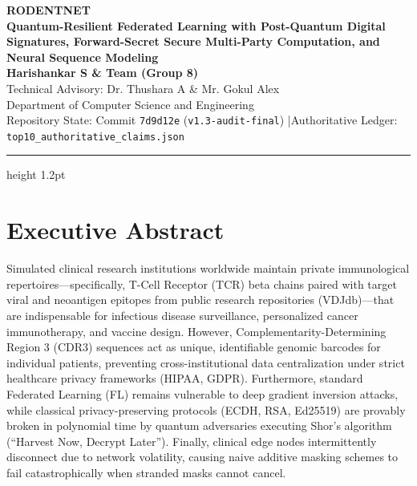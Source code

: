 \documentclass[11pt,a4paper]{report}
\begin{document}
\begin{center}
  {\Huge \textbf{RODENTNET}}\\[0.4cm]
  {\LARGE \textbf{Quantum-Resilient Federated Learning with Post-Quantum Digital Signatures, Forward-Secret Secure Multi-Party Computation, and Neural Sequence Modeling}}\\[0.6cm]
  {\large \textbf{Harishankar S \& Team (Group 8)}}\\[0.2cm]
  {\normalsize Technical Advisory: Dr. Thushara A \& Mr. Gokul Alex}\\[0.15cm]
  {\small Department of Computer Science and Engineering}\\[0.15cm]
  {\footnotesize Repository State: Commit \texttt{7d9d12e} (\texttt{v1.3-audit-final}) \quad|\quad Authoritative Ledger: \texttt{top10\_authoritative\_claims.json}}\\[0.4cm]
  \hrule height 1.2pt
\end{center}
\vspace{0.4cm}

\section*{Executive Abstract}
Simulated clinical research institutions worldwide maintain private immunological repertoires—specifically, T-Cell Receptor (TCR) beta chains paired with target viral and neoantigen epitopes from public research repositories (VDJdb)—that are indispensable for infectious disease surveillance, personalized cancer immunotherapy, and vaccine design. However, Complementarity-Determining Region 3 (CDR3) sequences act as unique, identifiable genomic barcodes for individual patients, preventing cross-institutional data centralization under strict healthcare privacy frameworks (HIPAA, GDPR). Furthermore, standard Federated Learning (FL) remains vulnerable to deep gradient inversion attacks, while classical privacy-preserving protocols (ECDH, RSA, Ed25519) are provably broken in polynomial time by quantum adversaries executing Shor's algorithm (``Harvest Now, Decrypt Later''). Finally, clinical edge nodes intermittently disconnect due to network volatility, causing naive additive masking schemes to fail catastrophically when stranded masks cannot cancel.
\end{document}
